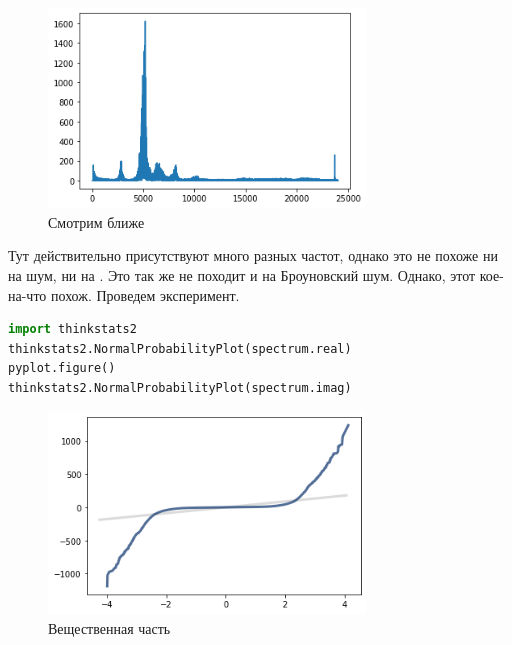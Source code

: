 \documentclass[a4paper,12pt]{report}
\begin{document}
    \begin{figure}[H]
        \centering
        \includegraphics[width=0.75\textwidth]{ex1_crickets_closer_look_1}
        \caption{Смотрим ближе}
        \label{fig:ex1_crickets_closer_look_1}
    \end{figure}
    
    Тут действительно присутствуют много разных частот, однако это не похоже ни на  шум, ни на . Это так же не походит и на Броуновский шум. Однако, этот  кое-на-что похож. Проведем эксперимент.
    
\begin{lstlisting}[language=Python,caption=Проверяем предположение]
import thinkstats2
thinkstats2.NormalProbabilityPlot(spectrum.real)
pyplot.figure()
thinkstats2.NormalProbabilityPlot(spectrum.imag)
\end{lstlisting}
    
    \begin{figure}[H]
        \centering
        \includegraphics[width=0.75\textwidth]{ex1_crickets_closer_look_2}
        \caption{Вещественная часть}
        \label{fig:ex1_crickets_closer_look_2}
    \end{figure}
    
\end{document}

